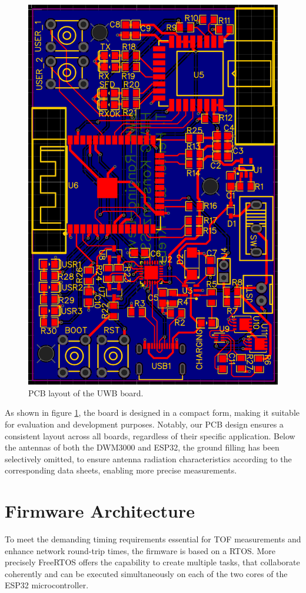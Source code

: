 \documentclass[final, conference, a4paper]{IEEEtran}
\begin{document}
\begin{figure}[hbt!]
	\centering
	\includegraphics[scale=0.30]{pic/pcb_design.png}
	\caption{PCB layout of the UWB board.}
	\label{fig:pcb}
\end{figure}
As shown in figure \ref{fig:pcb}, the board is designed in a compact form,
making it suitable for evaluation and development purposes.
Notably, our PCB design ensures a consistent layout across all boards, regardless of their specific application.
Below the antennas of both the DWM3000 and ESP32, the ground filling has been selectively omitted, to ensure antenna radiation characteristics according to the corresponding data sheets, enabling more precise measurements.

\section{Firmware Architecture}\label{section:firmware}
To meet the demanding timing requirements essential for \ac{TOF} measurements and enhance network round-trip times,
the firmware is based on a \ac{RTOS}.
More precisely FreeRTOS \cite{FreeRTOS_2023} offers the capability to create multiple tasks, that collaborate coherently and can be executed simultaneously on each of the two cores of the ESP32 microcontroller.
\end{document}

